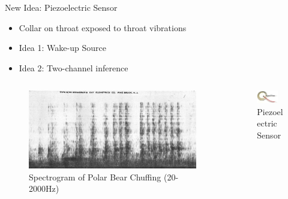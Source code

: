 \begin{frame}{New Idea: Piezoelectric Sensor}
     \centering
    \begin{itemize}
        \item Collar on throat exposed to throat vibrations
        \item Idea 1: Wake-up Source
        \item Idea 2: Two-channel inference
    \end{itemize}
    \begin{columns}
        \begin{column}{0.5\textwidth}
            \begin{figure}
                \centering
                \includegraphics[height=1.0\textheight,width=1.0\textwidth,keepaspectratio]{images/chuffingspec.png}
                \caption{Spectrogram of Polar Bear Chuffing (20-2000Hz)}
            \end{figure}
        \end{column}
        \begin{column}{0.5\textwidth}
            \begin{figure}
                \centering
                \includegraphics[height=0.8\textheight,width=0.8\textwidth,keepaspectratio]{images/piezo.jpg}
                \caption{Piezoelectric Sensor}
            \end{figure}
        \end{column}
    \end{columns}
\end{frame}

